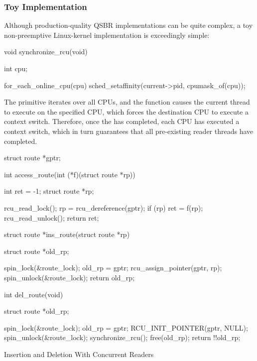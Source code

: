 \QuickQuizEnd

\subsubsection{Toy Implementation}
\label{sec:defer:Toy Implementation}

Although production-quality QSBR implementations can be quite complex,
a toy non-preemptive Linux-kernel implementation is exceedingly simple:

\begin{VerbatimN}[samepage=true]
void synchronize_rcu(void)
{
	int cpu;

	for_each_online_cpu(cpu)
		sched_setaffinity(current->pid, cpumask_of(cpu));
}
\end{VerbatimN}

The  primitive iterates over all CPUs, and
the  function causes the current thread to
execute on the specified CPU, which forces the destination CPU to execute
a context switch.
Therefore, once the  has completed, each CPU
has executed a context switch, which in turn guarantees that
all pre-existing reader threads have completed.

\begin{listing}
\begin{fcvlabel}
\begin{VerbatimL}[commandchars=\\\[\]]
struct route *gptr;

int access_route(int (*f)(struct route *rp))
{
	int ret = -1;
	struct route *rp;

	rcu_read_lock();
	rp = rcu_dereference(gptr);
	if (rp)
		ret = f(rp);		\lnlbl[access_rp]
	rcu_read_unlock();
	return ret;
}

struct route *ins_route(struct route *rp)
{
	struct route *old_rp;

	spin_lock(&route_lock);
	old_rp = gptr;
	rcu_assign_pointer(gptr, rp);
	spin_unlock(&route_lock);
	return old_rp;
}

int del_route(void)
{
	struct route *old_rp;

	spin_lock(&route_lock);
	old_rp = gptr;
	RCU_INIT_POINTER(gptr, NULL);
	spin_unlock(&route_lock);
	synchronize_rcu();
	free(old_rp);
	return !!old_rp;
}
\end{VerbatimL}
\end{fcvlabel}
\caption{Insertion and Deletion With Concurrent Readers}
\label{lst:defer:Insertion and Deletion With Concurrent Readers}
\end{listing}

